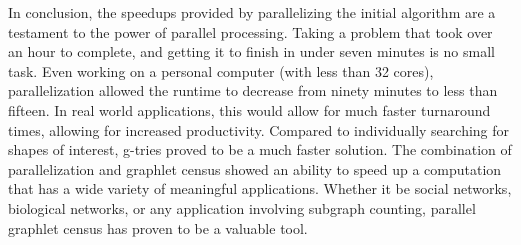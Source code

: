 \documentclass[12pt,twoside]{reedthesis}
\begin{document}
In conclusion, the speedups provided by parallelizing the initial algorithm are a testament to the power of parallel processing. Taking a problem that took over an hour to complete, and getting it to finish in under seven minutes is no small task. Even working on a personal computer (with less than 32 cores), parallelization allowed the runtime to decrease from ninety minutes to less than fifteen. In real world applications, this would allow for much faster turnaround times, allowing for increased productivity. Compared to individually searching for shapes of interest, g-tries proved to be a much faster solution. The combination of parallelization and graphlet census showed an ability to speed up a computation that has a wide variety of meaningful applications. Whether it be social networks, biological networks, or any application involving subgraph counting, parallel graphlet census has proven to be a valuable tool.

	




  \backmatter %

    \nocite{*}


  
 


\end{document}
